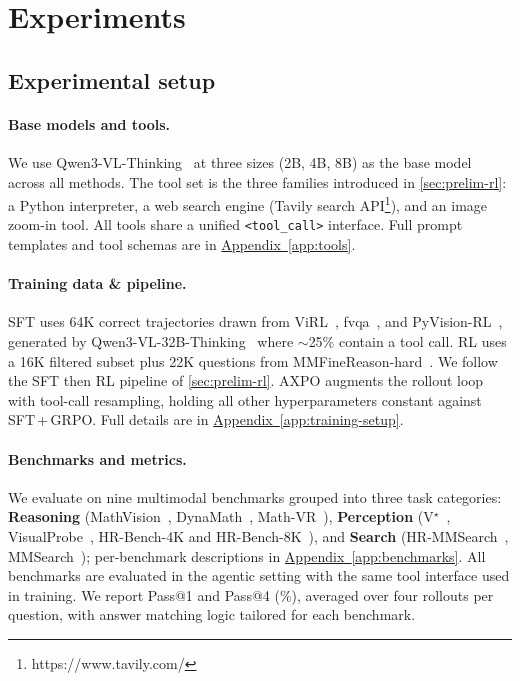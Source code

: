 \documentclass{llmxive}
\providecommand{\appref}[1]{\hyperref[#1]{Appendix~\ref*{#1}}}
\providecommand{\toolresample}{tool-call resampling\xspace}
\begin{document}
\section{Experiments}
\label{sec:experiments}

\subsection{Experimental setup}
\label{sec:setup}

\paragraph{Base models and tools.}
We use Qwen3-VL-Thinking~\citep{Qwen3VL} at three sizes (2B, 4B, 8B) as the base model across all methods. The tool set is the three families introduced in \autoref{sec:prelim-rl}: a Python interpreter, a web search engine (Tavily search API\footnote{https://www.tavily.com/}), and an image zoom-in tool. 
All tools share a unified \texttt{<tool\_call>} interface. Full prompt templates and tool schemas are in \appref{app:tools}.

\paragraph{Training data \& pipeline.}
SFT uses 64K correct trajectories drawn from ViRL~\citep{virl}, fvqa~\citep{fvqa}, and PyVision-RL~\citep{pyvision-rl}, generated by Qwen3-VL-32B-Thinking~\citep{Qwen3VL} where $\sim$25\% contain a tool call. RL uses a 16K filtered subset plus 22K questions from MMFineReason-hard~\citep{mmfinereason}.
We follow the SFT then RL pipeline of \autoref{sec:prelim-rl}. AXPO augments the rollout loop with \toolresample, holding all other hyperparameters constant against SFT\,+\,GRPO. Full details are in \appref{app:training-setup}.

\paragraph{Benchmarks and metrics.}
We evaluate on nine multimodal benchmarks grouped into three task categories: \textbf{Reasoning} (MathVision~\citep{mathvision}, DynaMath~\citep{dynamath}, Math-VR~\citep{mathvr}), \textbf{Perception} (V$^{\star}$~\citep{vstar}, VisualProbe~\citep{mini-o3}, HR-Bench-4K and HR-Bench-8K~\citep{HRBench}), and \textbf{Search} (HR-MMSearch~\citep{hrmmsearch}, MMSearch~\citep{mmsearch}); per-benchmark descriptions in \appref{app:benchmarks}. All benchmarks are evaluated in the agentic setting with the same tool interface used in training. We report Pass@1 and Pass@4 (\%), averaged over four rollouts per question, with answer matching logic tailored for each benchmark.
\end{document}
